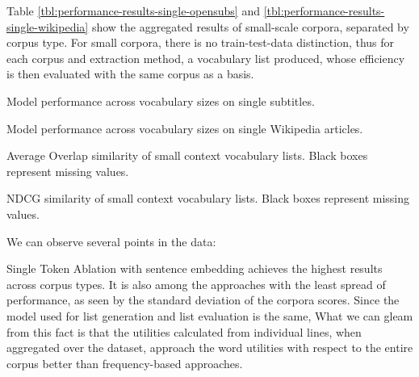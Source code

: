 Table \ref{tbl:performance-results-single-opensubs} and \ref{tbl:performance-results-single-wikipedia} show the aggregated results of small-scale corpora, separated by corpus type.
For small corpora, there is no train-test-data distinction, thus for each corpus and extraction method, a vocabulary list produced, whose efficiency is then evaluated with the same corpus as a basis.
%
% 	


\begin{table}[H]
	\centering
	\resizebox{\textwidth}{!}{%
		
	}
	\caption{Model performance across vocabulary sizes on single subtitles.}
	\label{tbl:performance-results-single-opensubs}
\end{table}

\begin{table}[H]
	\centering
	\resizebox{\textwidth}{!}{%
		
	}
	\caption{Model performance across vocabulary sizes on single Wikipedia articles.}
	\label{tbl:performance-results-single-wikipedia}
\end{table}

\begin{table}[H]
	\centering
	\resizebox{\textwidth}{!}{%
		
	}
	\caption{Average Overlap similarity of small context vocabulary lists. Black boxes represent missing values.}
	\label{tbl:similarity-results-single-average-overlap}
\end{table}

\begin{table}[H]
	\centering
	\resizebox{\textwidth}{!}{%
		
	}
	\caption{NDCG similarity of small context vocabulary lists. Black boxes represent missing values.}
	\label{tbl:similarity-results-single-ndcg}
\end{table}





We can observe several points in the data:

Single Token Ablation with sentence embedding achieves the highest results across corpus types.
It is also among the approaches with the least spread of performance, as seen by the standard deviation of the corpora scores.
Since the model used for list generation and list evaluation is the same,
What we can gleam from this fact is that the utilities calculated from individual lines, when aggregated over the dataset, approach the word utilities with respect to the entire corpus better than frequency-based approaches.

